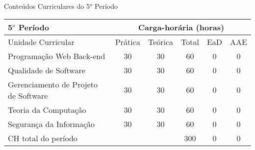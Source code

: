 \begin{quadro}[ht!]
\centering
\caption{Conteúdos Curriculares do 5$^o$ Período}\label{qua:periodo5}
\begin{tabular}{|p{8.0cm}|c|c|c|c|c|}
\hline
\rowcolor{blue1} 5$^o$ Período & \multicolumn{5}{|c|}{\centering Carga-horária (horas)} \\ \hline
\rowcolor{blue1} Unidade Curricular & Prática & Teórica & Total & EaD & AAE \\ \hline
Programação Web Back-end & 30 & 30 & 60 & 0	&	0 \\	\hline
Qualidade de Software & 30 & 30 & 60 & 0	&	0 \\	\hline
Gerenciamento de Projeto de Software & 30 & 30 & 60 & 0	&	0 \\	\hline
Teoria da Computação & 30 & 30 & 60 & 0	&	0 \\	\hline
Segurança da Informação & 30 & 30 & 60 & 0	&	0 \\	\hline
CH total do período & \multicolumn{2}{p{3.3cm}|}{\cellcolor{blue1}} & 300 & 0	&	0 \\ \hline
\end{tabular} \end{quadro}